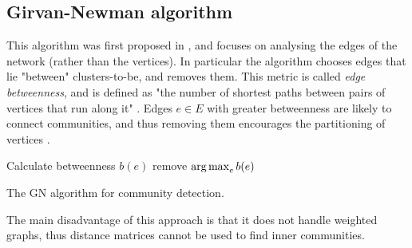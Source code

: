 \documentclass[../main.tex]{subfiles} \label{chapter_soa}
\begin{document}
\subsection{Girvan-Newman algorithm} \label{subsection_gn}
This algorithm was first proposed in \cite{Girvan2002}, and focuses on analysing the edges of the network (rather than the vertices). In particular the algorithm chooses edges that lie "between" clusters-to-be, and removes them. This metric is called \emph{edge betweenness}, and is defined as "the number of shortest paths between pairs of vertices that run along it" \cite{Girvan2002}. Edges $e\in E$ with greater betweenness are likely to connect communities, and thus removing them encourages the partitioning of vertices \cite{Lu2012}.
\begin{algorithm}
\begin{algorithmic}[1]
\Repeat
{}
    \State Calculate betweenness $b(e)$
\EndFor
\State remove $\operatorname*{arg\,max}_e{b(e)}$
\EndFunction
\caption{The GN algorithm for community detection.}\label{alg_gn}
\end{algorithmic}
\end{algorithm}
\par The main disadvantage of this approach is that it does not handle weighted graphs, thus distance matrices cannot be used to find inner communities.
\end{document}
